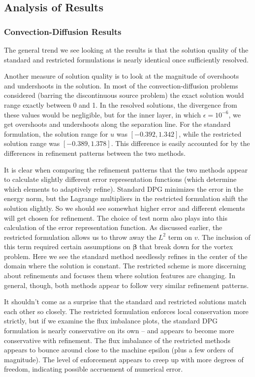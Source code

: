 \documentclass[letterpaper]{article}
\def\bbeta{\boldsymbol\beta}
\begin{document}
\subsection{Analysis of Results}\label{sec:problemAnalysis}
\subsubsection{Convection-Diffusion Results}
The general trend we see looking at the results is that the solution quality
of the standard and restricted formulations is nearly identical once
sufficiently resolved.

Another measure of solution quality is to look at the magnitude of overshoots
and undershoots in the solution. In most of the convection-diffusion problems considered (barring
the discontinuous source problem) the exact solution would range exactly
between 0 and 1. In the resolved solutions, the divergence from these values
would be negligible, but for the inner layer, in which $\epsilon=10^{-6}$, we
get overshoots and undershoots along the separation line. For the
standard formulation, the solution range for $u$ was $[-0.392,1.342]$,
while the restricted solution range was $[-0.389,1.378]$. This difference is
easily accounted for by the differences in refinement patterns between the two
methods.

It is clear when comparing the refinement patterns that the two methods appear
to calculate slightly different error representation functions (which
determine which elements to adaptively refine). Standard DPG minimizes the
error in the energy norm, but the Lagrange multipliers in the restricted
formulation shift the solution slightly. So we should see somewhat higher
error and different elements will get chosen for refinement. The choice of
test norm also plays into this calculation of the error representation
function. As discussed earlier, the restricted formulation allows us to
throw away the $L^2$ term on $v$. The inclusion of this term required certain
assumptions on $\bbeta$ \cite{ChanHeuerThanhDemkowicz2012} that break down for
the vortex problem. Here we see the standard method needlessly refines
in the center of the domain where the solution is constant. The restricted
scheme is more discerning about refinements and focuses them where
solution features are changing. In general, though, both methods appear to
follow very similar refinement patterns.

It shouldn't come as a surprise that the standard and restricted
solutions match each other so closely. The restricted formulation
enforces local conservation more strictly, but if we examine the flux
imbalance plots, the standard DPG formulation is nearly conservative on its
own -- and appears to become more conservative with refinement. The flux
imbalance of the restricted methods appears to bounce around close to the
machine epsilon (plus a few orders of magnitude). The level of enforcement
appears to creep up with more degrees of freedom, indicating possible
accruement of numerical error.
\end{document}
